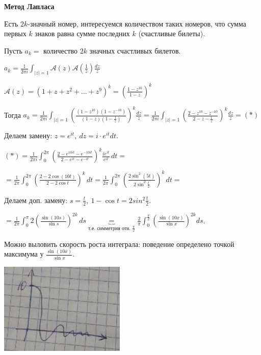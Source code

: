 \begin{example}
    \textbf{Метод Лапласа}

    Есть $2k$-значный номер, интересуемся количеством таких номеров, что сумма первых $k$ знаков равна сумме последних $k$ (счастливые билеты).

    Пусть $a_k = $ количество $2k$ значных счастливых билетов.

    $a_k = \frac{1}{2\pi i} \int_{|z| = 1} \mathcal{A}(z) \mathcal{A}(\frac{1}{z}) \frac{dz}{z}$

    $\mathcal{A}(z) = (1 + z + z^2 + \ldots + z^9)^k = \left( \frac{1 - z^{10}}{1 - z} \right)^k$

    Тогда $a_k =
    \frac{1}{2 \pi i} \int_{|z| = 1} \left( \frac{(1 - z^{10})(1 - z^{-10})}{(1 - z)(1 - \frac{1}{z})} \right)^k \frac{dz}{z} =
    \frac{1}{2\pi i} \int_{|z| = 1} \left( \frac{2 - z^{10} - z^{-10}}{2 - z - \frac{1}{z}} \right)^k \frac{dz}{z} = (*)$

    Делаем замену: $z = e^{it}, \ dz = i \cdot e^{it} dt$.

    $(*) = \frac{1}{2\pi i} \int_{0}^{2\pi} \left( \frac{2 - e^{10 it} - e^{-10 it}}{2 - e^{it} - e^{-it}} \right)^k \frac{i e^{it}}{e^{it}} \, dt = $

    $= \frac{1}{2\pi} \int_{0}^{2\pi} \left( \frac{2 - 2 \cos{(10 t)}}{2 - 2\cos{t}} \right)^k \, dt = \frac{1}{2\pi} \int_{0}^{2\pi} \left( \frac{2\sin^2{(5 t)}}{2 \sin^2{\frac{t}{2}}} \right)^k \, dt =$

    Делаем доп. замену: $s = \frac{t}{2}, \ 1 - \cos{t} = 2 sin^2{\frac{t}{2}}$.

    $= \frac{1}{2\pi} \int_{0}^\pi 2\left( \frac{\sin {(10s)}}{\sin s} \right)^{2k} \, ds \underbrace{=}_{\text{т.е. симметрия отн. } \frac{\pi}{2}} \frac{2}{\pi} \int_{0}^{\frac{\pi}{2}} \left( \frac{\sin (10x)}{\sin x} \right)^{2k} ds$.


    Можно выловить скорость роста интеграла: поведение определено точкой максимума у $\frac{\sin{(10x)}}{\sin{x}}$.

    \begin{center}
        \includegraphics[width=6cm]{assets/04-functions-of-complex-variables/laplasian-method.png}
    \end{center}


\end{example}

